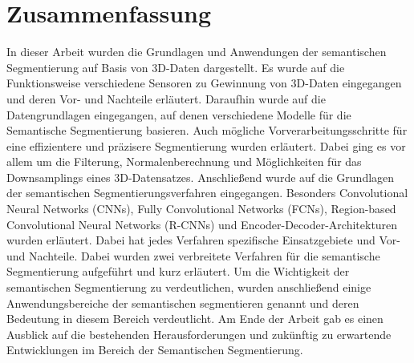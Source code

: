 \chapter{Zusammenfassung}
In dieser Arbeit wurden die Grundlagen und Anwendungen der semantischen
Segmentierung auf Basis von 3D-Daten dargestellt. Es wurde auf die
Funktionsweise verschiedene Sensoren zu Gewinnung von 3D-Daten eingegangen und
deren Vor- und Nachteile erläutert. Daraufhin wurde auf die Datengrundlagen
eingegangen, auf denen verschiedene Modelle für die Semantische Segmentierung
basieren. Auch mögliche Vorverarbeitungsschritte für eine effizientere und
präzisere Segmentierung wurden erläutert. Dabei ging es vor allem um die
Filterung, Normalenberechnung und Möglichkeiten für das Downsamplings eines
3D-Datensatzes. Anschließend wurde auf die Grundlagen der semantischen
Segmentierungsverfahren eingegangen. Besonders Convolutional Neural Networks
(CNNs), Fully Convolutional Networks (FCNs), Region-based Convolutional Neural
Networks (R-CNNs) und Encoder-Decoder-Architekturen wurden erläutert. Dabei hat
jedes Verfahren spezifische Einsatzgebiete und Vor- und Nachteile. Dabei wurden
zwei verbreitete Verfahren für die semantische Segmentierung aufgeführt und
kurz erläutert. Um die Wichtigkeit der semantischen Segmentierung zu
verdeutlichen, wurden anschließend einige Anwendungsbereiche der semantischen
segmentieren genannt und deren Bedeutung in diesem Bereich verdeutlicht. Am
Ende der Arbeit gab es einen Ausblick auf die bestehenden Herausforderungen und zukünftig
zu erwartende Entwicklungen im Bereich der Semantischen Segmentierung.